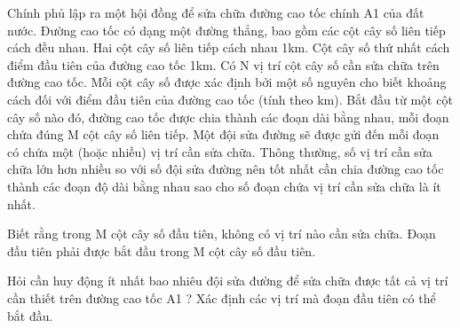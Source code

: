 Chính phủ lập ra một hội đồng để sửa chữa đường cao tốc chính       A1      của đất nước. Đường cao tốc có dạng một đường thẳng, bao gồm các cột cây số liên tiếp cách đều nhau. Hai cột cây số liên   tiếp cách nhau 1km. Cột cây số thứ nhất cách điểm đầu tiên của đường cao tốc 1km. Có N vị trí cột cây số cần sửa chữa trên đường cao tốc. Mỗi cột cây số được xác định bởi một số nguyên cho biết   khoảng cách đối với điểm đầu tiên của đường cao tốc (tính theo km). Bắt đầu từ một cột cây số nào đó, đường cao tốc được chia thành các đoạn dài bằng nhau, mỗi đoạn chứa đúng M cột cây số liên tiếp.   Một đội sửa đường sẽ được gửi đến mỗi đoạn có chứa một (hoặc nhiều) vị trí cần sửa chữa. Thông thường, số vị trí cần sửa chữa lớn hơn nhiều so với số đội sửa đường nên tốt nhất cần chia đường cao tốc   thành các đoạn độ dài bằng nhau sao cho số đoạn chứa vị trí cần sửa chữa là ít nhất.  

   Biết rằng trong M cột cây số đầu tiên, không có vị trí nào cần sửa chữa. Đoạn đầu tiên phải được bắt đầu trong M cột cây số đầu tiên.  

   Hỏi cần huy động ít nhất bao nhiêu đội sửa đường để sửa chữa được tất cả vị trí cần thiết trên đường cao tốc       A1      ? Xác định các vị trí mà đoạn đầu tiên có thể bắt đầu.  

\